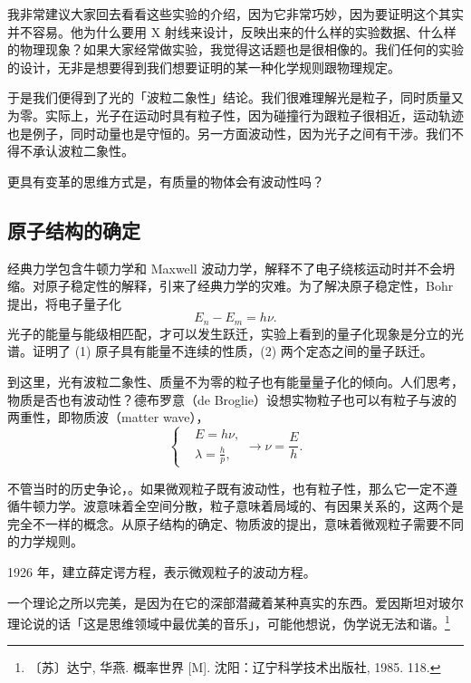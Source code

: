 我非常建议大家回去看看这些实验的介绍，因为它非常巧妙，因为要证明这个其实并不容易。他为什么要用 X 射线来设计，反映出来的什么样的实验数据、什么样的物理现象？如果大家经常做实验，我觉得这话题也是很相像的。我们任何的实验的设计，无非是想要得到我们想要证明的某一种化学规则跟物理规定。

于是我们便得到了光的「波粒二象性」结论。我们很难理解光是粒子，同时质量又为零。实际上，光子在运动时具有粒子性，因为碰撞行为跟粒子很相近，运动轨迹也是例子，同时动量也是守恒的。另一方面波动性，因为光子之间有干涉。我们不得不承认波粒二象性。

更具有变革的思维方式是，有质量的物体会有波动性吗？

\subsection{原子结构的确定}
经典力学包含牛顿力学和 Maxwell 波动力学，解释不了电子绕核运动时并不会坍缩。对原子稳定性的解释，引来了经典力学的灾难。为了解决原子稳定性，Bohr 提出，将电子量子化
\begin{equation}
    E_n - E_m = h\nu. 
\end{equation}
光子的能量与能级相匹配，才可以发生跃迁，实验上看到的量子化现象是分立的光谱。证明了 (1) 原子具有能量不连续的性质，(2) 两个定态之间的量子跃迁。

到这里，光有波粒二象性、质量不为零的粒子也有能量量子化的倾向。人们思考，物质是否也有波动性？德布罗意（de Broglie）设想实物粒子也可以有粒子与波的两重性，即物质波（matter wave），
\begin{equation}
    \left\{
        \begin{aligned}
            &E = h\nu,\\
            &\lambda = \frac hp, 
        \end{aligned}
    \right.
    \rightarrow
     \nu = \frac Eh. 
\end{equation}

不管当时的历史争论，。如果微观粒子既有波动性，也有粒子性，那么它一定不遵循牛顿力学。波意味着全空间分散，粒子意味着局域的、有因果关系的，这两个是完全不一样的概念。从原子结构的确定、物质波的提出，意味着微观粒子需要不同的力学规则。

1926 年，建立薛定谔方程，表示微观粒子的波动方程。

一个理论之所以完美，是因为在它的深部潜藏着某种真实的东西。爱因斯坦对玻尔理论说的话「这是思维领域中最优美的音乐」，可能他想说，伪学说无法和谐。\footnote{〔苏〕达宁, 华燕. 概率世界 [M]. 沈阳：辽宁科学技术出版社, 1985. 118. }

